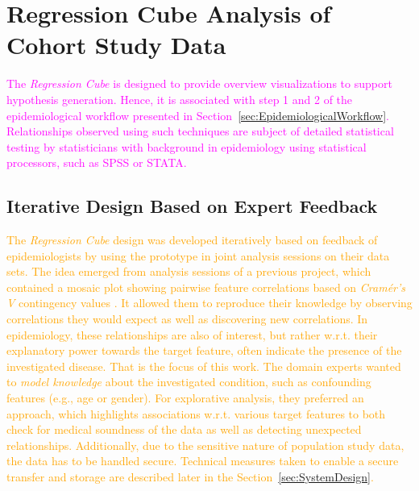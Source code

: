 \documentclass[journal]{style/vgtc} 			          %
\newcommand{\design}[1]{\textcolor{orange}{#1}}
\newcommand{\magenta}[1]{\textcolor{magenta}{#1}}
\begin{document}
\section{Regression Cube Analysis of Cohort Study Data}
\magenta{
The \emph{Regression Cube} is designed to provide overview visualizations to support hypothesis generation.
Hence, it is associated with step 1 and 2 of the epidemiological workflow presented in Section~\ref{sec:EpidemiologicalWorkflow}.
Relationships observed using such techniques are subject of detailed statistical testing by statisticians with background in epidemiology using statistical processors, such as SPSS or STATA.
}
\subsection{Iterative Design Based on Expert Feedback}
\design{
The \emph{Regression Cube} design was developed iteratively based on feedback of epidemiologists by using the prototype in joint analysis sessions on their data sets.
The idea emerged from analysis sessions of a previous project, which contained a mosaic plot showing pairwise feature correlations based on \emph{Cram\'{e}r's V} contingency values \cite{Klemm2014VIS}.
It allowed them to reproduce their knowledge by observing correlations they would expect as well as discovering new correlations.
In epidemiology, these relationships are also of interest, but rather w.r.t. their explanatory power towards the target feature, often indicate the presence of the investigated disease.
That is the focus of this work.
The domain experts wanted to \emph{model knowledge} about the investigated condition, such as confounding features (e.g., age or gender).
For explorative analysis, they preferred an approach, which highlights associations w.r.t. various target features to both check for medical soundness of the data as well as detecting unexpected relationships.
Additionally, due to the sensitive nature of population study data, the data has to be handled secure.
Technical measures taken to enable a secure transfer and storage are described later in the Section~\ref{sec:SystemDesign}.
}
\end{document}
